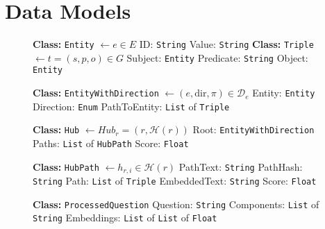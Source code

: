 

\section{Data Models}
\label{sec:hublink_data_models}

\begin{figure}
\begin{algorithmic}[1]

\Statex \textbf{Class:} \texttt{Entity} \(\leftarrow e\in E\) 
    \Statex \quad ID: \texttt{String}
    \Statex \quad Value: \texttt{String}
\Statex \textbf{Class:} \texttt{Triple} \(\leftarrow  t = (s, p, o) \in G\) 
    \Statex \quad Subject: \texttt{Entity}
    \Statex \quad Predicate: \texttt{String}
    \Statex \quad Object: \texttt{Entity}

\Statex
\Statex \textbf{Class:} \texttt{EntityWithDirection} \(\leftarrow (e, \text{dir}, \pi) \in \mathcal{D}_e\)
    \Statex \quad Entity: \texttt{Entity} 
    \Statex \quad Direction: \texttt{Enum} 
    \Statex \quad PathToEntity: \texttt{List} of \texttt{Triple} 

\Statex
\Statex \textbf{Class:} \texttt{Hub} \(\leftarrow Hub_r = (r, \mathcal{H}(r))\)
    \Statex \quad Root: \texttt{EntityWithDirection} 
    \Statex \quad Paths: \texttt{List} of \texttt{HubPath} 
    \Statex \quad Score: \texttt{Float} 

\Statex
\Statex \textbf{Class:} \texttt{HubPath} \(\leftarrow h_{r,i} \in \mathcal{H}(r)\)
    \Statex \quad PathText: \texttt{String} 
    \Statex \quad PathHash: \texttt{String} 
    \Statex \quad Path: \texttt{List} of \texttt{Triple} 
    \Statex \quad EmbeddedText: \texttt{String} 
    \Statex \quad Score: \texttt{Float} 

\Statex
\Statex \textbf{Class:} \texttt{ProcessedQuestion}
    \Statex \quad Question: \texttt{String} 
    \Statex \quad Components: \texttt{List} of \texttt{String} 
    \Statex \quad Embeddings: \texttt{List} of \texttt{List} of \texttt{Float} 


\end{algorithmic}
\end{figure}
